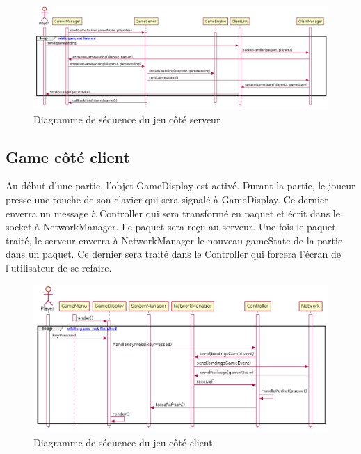 \documentclass{article}
\begin{document}
\begin{figure}[H]
    \centering
    \includegraphics[width=1\textwidth]{../res/uml/sequence/GameServerSequence.png}
    \caption{Diagramme de séquence du jeu côté serveur}
    \label{fig:GameServerSeqDiagram}
\end{figure}

\subsection{Game côté client}

Au début d'une partie, l'objet GameDisplay est activé. Durant la partie, le joueur presse une touche de son clavier qui sera signalé à GameDisplay. Ce dernier enverra un message à Controller qui sera transformé en paquet et écrit dans le socket à NetworkManager. Le paquet sera reçu au serveur. Une fois le paquet traité, le serveur enverra à NetworkManager le nouveau gameState de la partie dans un paquet. Ce dernier sera traité dans le Controller qui forcera l'écran de l'utilisateur de se refaire.

\begin{figure}[H]
    \centering
    \includegraphics[width=1\textwidth]{../res/uml/sequence/GameClientSequence.png}
    \caption{Diagramme de séquence du jeu côté client}
    \label{fig:GameClientSeqDiagram}
\end{figure}




\end{document}
